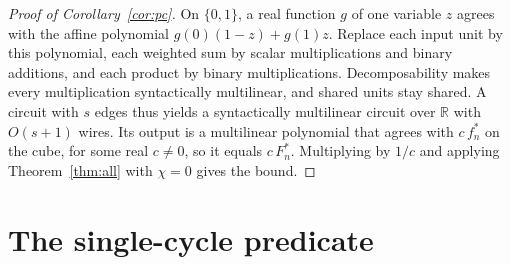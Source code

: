 \documentclass[11pt]{article}
\theoremstyle{remark}
\begin{document}
\begin{proof}[Proof of Corollary~\ref{cor:pc}]
On \(\{0,1\}\), a real function \(g\) of one variable \(z\) agrees with
the affine polynomial \(g(0)(1-z)+g(1)z\). Replace each input unit by
this polynomial, each weighted sum by scalar multiplications and binary
additions, and each product by binary multiplications. Decomposability
makes every multiplication syntactically multilinear, and shared units
stay shared. A circuit with \(s\) edges thus yields a syntactically
multilinear circuit over \(\mathbb R\) with \(O(s+1)\) wires. Its output
is a multilinear polynomial that agrees with \(c\,f^*_n\) on the cube,
for some real \(c\ne0\), so it equals \(c\,F^*_n\). Multiplying by
\(1/c\) and applying Theorem~\ref{thm:all} with \(\chi=0\) gives the
bound.
\end{proof}

\section{The single-cycle predicate}\label{sec:cycle-only}
\end{document}
